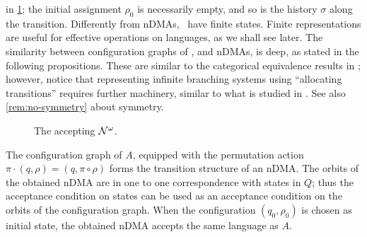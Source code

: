 in \cref{fig:hd-names-omega}; the initial assignment $\rho_0$ is necessarily empty, and so is the history $\sigma$ along the transition.
%
%
Differently from nDMAs, \hdmas\ have finite states. 
Finite representations are useful for effective operations on languages, as we shall see later. The similarity between configuration graphs of \hdmas, and nDMAs, is deep, as stated in the following propositions. These are similar to the categorical equivalence results in \cite{GadducciMM06,FioreS06}; however, notice that representing infinite branching systems using  ``allocating transitions'' requires further machinery, similar to what is studied in \cite{CianciaM10}. See also \cref{rem:no-symmetry} about symmetry.

\begin{figure}[t]
\centering
{}
\caption{The \hdma{} accepting $\mathcal{N}^\omega$.}
\label{fig:hd-names-omega}
\end{figure}

\begin{proposition}\label{pro:nset-to-nom}
 The configuration graph of $A$, equipped with the permutation action $\pi \cdot (q,\rho) = (q,\pi \circ \rho)$ forms the transition structure of an nDMA. The orbits of the obtained nDMA are in one to one correspondence with states in $Q$; thus the acceptance condition on states can be used as an acceptance condition on the orbits of the configuration graph. When the configuration $(q_0,\rho_0)$ is chosen as initial state, the obtained nDMA accepts the same language as $A$.
\end{proposition}
%

